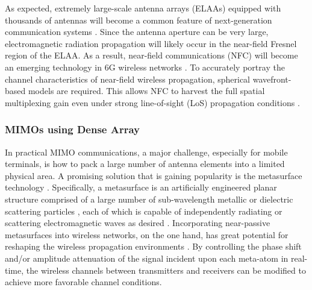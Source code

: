 \documentclass[lettersize,journal]{IEEEtran}
\begin{document}
As expected, extremely large-scale antenna arrays (ELAAs) equipped with thousands of antennas will become a common feature of next-generation communication systems \cite{TWC_2022_Lu_Communicating}. Since the antenna aperture can be very large, electromagnetic radiation propagation will likely occur in the near-field Fresnel region of the ELAA. As a result, near-field communications (NFC) will become an emerging technology in 6G wireless networks \cite{arXiv_2023_An_Toward}. To accurately portray the channel characteristics of near-field wireless propagation, spherical wavefront-based models are required. This allows NFC to harvest the full spatial multiplexing gain even under strong line-of-sight (LoS) propagation conditions \cite{arXiv_2023_An_Toward, CM_2023_Cui_Near}.

\subsubsection{MIMOs using Dense Array}
In practical MIMO communications, a major challenge, especially for mobile terminals, is how to pack a large number of antenna elements into a limited physical area. A promising solution that is gaining popularity is the metasurface technology \cite{TCOM_2022_An_Low, LSA_2014_Cui_Coding}. Specifically, a metasurface is an artificially engineered planar structure comprised of a large number of sub-wavelength metallic or dielectric scattering particles \cite{LSA_2014_Cui_Coding}, each of which is capable of independently radiating or scattering electromagnetic waves as desired \cite{JSAC_2020_Renzo_Smart}. Incorporating near-passive metasurfaces into wireless networks, on the one hand, has great potential for reshaping the wireless propagation environments \cite{TCOM_2022_An_Low, WC_2022_An_Codebook}. By controlling the phase shift and/or amplitude attenuation of the signal incident upon each meta-atom in real-time, the wireless channels between transmitters and receivers can be modified to achieve more favorable channel conditions.
\end{document}
